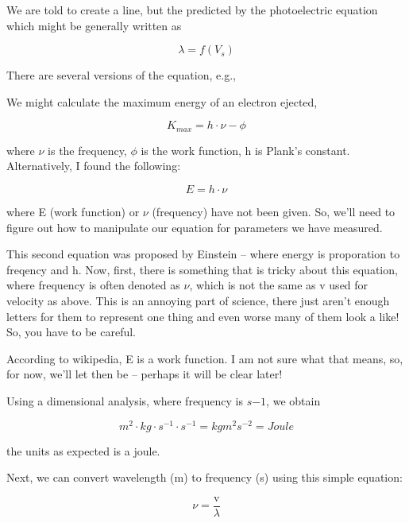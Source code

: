 \documentclass{article}
\begin{document}
We are told to create a line, but the predicted by the photoelectric equation which might be generally written as 

\begin{equation}
\lambda = f(V_s)
\end{equation}

There are several versions of the equation, e.g.,

We might calculate the maximum energy of an electron ejected,

\begin{equation}
K_{max} = h \cdot \nu - \phi
\end{equation}

\noindent where $\nu$ is the frequency, $\phi$ is the work function, h is Plank's constant. Alternatively, I found the following: 

\begin{equation}
E = h \cdot \nu
\end{equation}

\noindent where E (work function) or $\nu$ (frequency) have not been given. So, we'll need to figure out how to manipulate our equation for parameters we have measured. 

This second equation was proposed by Einstein -- where energy is proporation to freqency and h. Now, first, there is something that is tricky about this equation, where frequency is often denoted as $\nu$, which is not the same as v used for velocity as above. This is an annoying part of science, there just aren't enough letters for them to represent one thing and even worse many of them look a like! So, you have to be careful. 

According to wikipedia, E is a work function. I am not sure what that means, so, for now, we'll let then be -- perhaps it will be clear later!

Using a dimensional analysis, where frequency is $s{-1}$, we obtain

\begin{equation}
m^2 \cdot kg \cdot s^{-1} \cdot s^{-1} = kg m^2 s^{-2} = Joule
\end{equation}

\noindent the units as expected is a joule. 

Next, we can convert wavelength (m) to frequency (s) using this simple equation:

\begin{equation}
\nu = \frac{\text{v}}{\lambda}
\end{equation}
\end{document}
